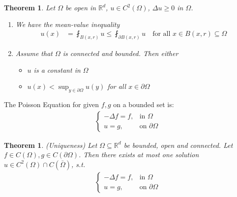\documentclass{report}
\theoremstyle{tommy}
\newtheorem{thm}[defn]{Theorem}
\begin{document}
\begin{thm}
  Let \(\Omega\) be open in \(\mathbb{R}^d\), \(u \in C^2(\Omega)\), \(\Delta u \ge 0\) in \(\Omega\). \begin{enumerate}
    \item We have the mean-value inequality \begin{align*}
      u(x) &= \fint_{B(x, r)} u \le \fint_{\partial B(x, r)} u \quad \text{for all } x \in B(x, r) \subseteq \Omega
    \end{align*}
    \item Assume that \(\Omega\) is connected and bounded. Then either \begin{itemize}
      \item \(u\) is a constant in \(\Omega\)
      \item \(u(x) < \sup_{y \in \partial \Omega} u(y)\) for all \(x \in \partial \Omega\)
    \end{itemize}
  \end{enumerate}
\end{thm}

The Poisson Equation for given \(f, g\) on a bounded set is:
\begin{align*}
  \begin{cases}
    - \Delta f = f, &\text{in } \Omega \\
    u = g, &\text{on } \partial \Omega
  \end{cases}
\end{align*} 

\begin{thm}(Uniqueness)
  Let \(\Omega \subseteq \mathbb{R}^d\) be bounded, open  and connected. Let \(f \in C(\Omega), g \in C(\partial \Omega)\). Then there exists \emph{at most} one solution \(u \in C^2(\Omega) \cap C(\bar \Omega)\), s.t. \begin{align*}
    \begin{cases}
      - \Delta f = f, &\text{in } \Omega \\
      u = g, &\text{on } \partial \Omega
    \end{cases}
  \end{align*}
\end{thm}
\end{document}
